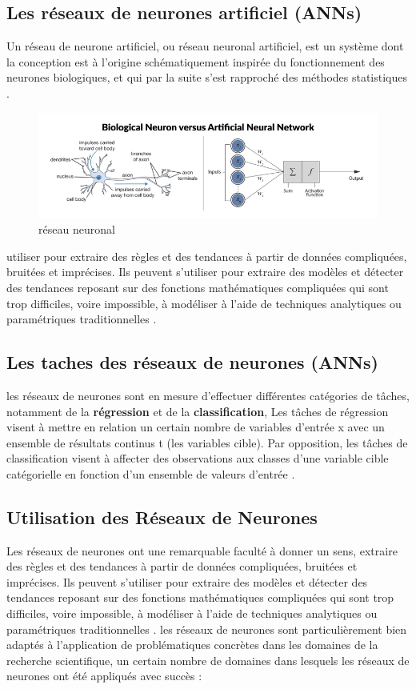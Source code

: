 \documentclass[12pt]{report}
\begin{document}
\subsection{Les réseaux de neurones artificiel (ANNs)}
Un réseau de neurone artificiel, ou réseau neuronal artificiel, est un système dont la conception est à l'origine schématiquement inspirée du fonctionnement des neurones biologiques, et qui par la suite s'est rapproché des méthodes statistiques \cite{ref12} .\\
\begin{figure}[h]
\begin{center}
\includegraphics[width=450]{bio.png}
\caption{réseau neuronal}

\end{center}
\end{figure}


utiliser pour extraire des règles et des tendances à partir de données compliquées, bruitées et imprécises. Ils peuvent s'utiliser pour extraire des modèles et détecter des tendances reposant sur des fonctions mathématiques compliquées qui sont trop difficiles, voire impossible, à modéliser à l'aide de techniques analytiques ou paramétriques traditionnelles \cite{ref12} .
\subsection{Les taches des réseaux de neurones (ANNs) }
les réseaux de neurones sont en mesure d'effectuer différentes catégories de tâches, notamment de la \textbf{régression} et de la \textbf{classification}, Les tâches de régression visent à mettre en relation un certain nombre de variables d'entrée x avec un ensemble de résultats continus t (les variables cible). Par opposition, les tâches de classification visent à affecter des observations aux classes d'une variable cible catégorielle en fonction d'un ensemble de valeurs d'entrée \cite{ref13} .

\subsection{Utilisation des Réseaux de Neurones}
Les réseaux de neurones ont une remarquable faculté à donner un sens, extraire des règles et des tendances à partir de données compliquées, bruitées et imprécises. Ils peuvent s'utiliser pour extraire des modèles et détecter des tendances reposant sur des fonctions mathématiques compliquées qui sont trop difficiles, voire impossible, à modéliser à l'aide de techniques analytiques ou paramétriques traditionnelles \cite{ref13} .  les réseaux de neurones sont particulièrement bien adaptés à l'application de problématiques concrètes dans les domaines de la recherche scientifique, un certain nombre de domaines dans lesquels les réseaux de neurones ont été appliqués avec succès :
\end{document}
